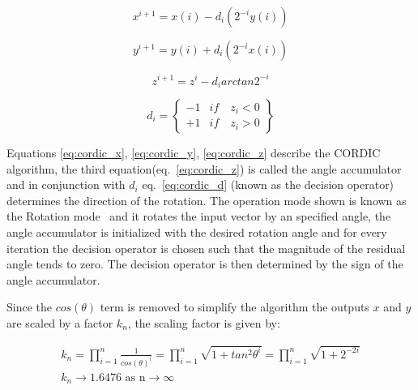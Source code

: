  \begin{equation} 
x^{i+1} = x(i) - d_i(2^{-i}y(i))
    \label{eq:cordic_x}
\end{equation}

\begin{equation} 
y^{i+1} = y(i) + d_i(2^{-i}x(i))
	\label{eq:cordic_y}
\end{equation}

\begin{equation} 
z^{i+1} = z^{i} - d_i arctan 2^{-i}
    \label{eq:cordic_z}
\end{equation}

\begin{equation} 
 d_i = \begin{Bmatrix}
      -1 & if \quad z_i  < 0  \\
      +1 & if \quad z_i  > 0 
       \end{Bmatrix}
   \label{eq:cordic_d}
   \end{equation}

Equations \ref{eq:cordic_x}, \ref{eq:cordic_y}, \ref{eq:cordic_z} describe the CORDIC algorithm, the third equation(eq.~\ref{eq:cordic_z}) is called the angle accumulator and in conjunction with $d_i$ eq.~\ref{eq:cordic_d} (known as the decision operator) determines the direction of the rotation. The operation mode shown is known as the Rotation mode~\cite{voider1959} and it rotates the input vector by an specified angle, the angle accumulator is initialized with the desired rotation angle and for every iteration the decision operator is chosen such that the magnitude of the residual angle tends to zero. The decision operator is then determined by the sign of the angle accumulator.  

Since the $cos(\theta)$ term is removed to simplify the algorithm the outputs $x$ and $y$ are scaled by a factor $k_n$, the scaling factor is given by:

%
\begin{equation} 
\begin{gathered}
k_n = \prod_{i=1}^{n} \frac{1}{cos(\theta)^{i}} = \prod_{i=1}^{n} \sqrt{1+tan^2\theta^{i}} =  \prod_{i=1}^{n} \sqrt{1+2^{-2i}}\\
k_n \rightarrow 1.6476 \textrm{ as n} \rightarrow \infty
    \label{eq:cordic_kn}
\end{gathered}
\end{equation}


